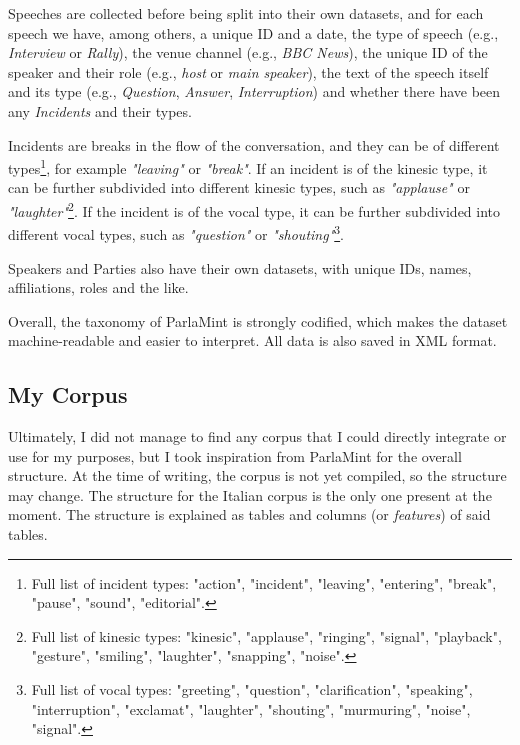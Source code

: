 Speeches are collected before being split into their own datasets, and for each speech we have, among others, a unique ID and a date, the type of speech (e.g., \textit{Interview} or \textit{Rally}), the venue channel (e.g., \textit{BBC News}), the unique ID of the speaker and their role (e.g., \textit{host} or \textit{main speaker}), the text of the speech itself and its type (e.g., \textit{Question}, \textit{Answer}, \textit{Interruption}) and whether there have been any \textit{Incidents} and their types.

Incidents are breaks in the flow of the conversation, and they can be of different types\footnote{Full list of incident types: "action", "incident", "leaving", "entering", "break", "pause", "sound", "editorial".}, for example \textit{"leaving"} or \textit{"break"}. If an incident is of the kinesic type, it can be further subdivided into different kinesic types, such as \textit{"applause"} or \textit{"laughter"}\footnote{Full list of kinesic types: "kinesic", "applause", "ringing", "signal", "playback", "gesture", "smiling", "laughter", "snapping", "noise".}. If the incident is of the vocal type, it can be further subdivided into different vocal types, such as \textit{"question"} or \textit{"shouting"}\footnote{Full list of vocal types: "greeting", "question", "clarification", "speaking", "interruption", "exclamat", "laughter", "shouting", "murmuring", "noise", "signal".}.

Speakers and Parties also have their own datasets, with unique IDs, names, affiliations, roles and the like.

Overall, the taxonomy of ParlaMint is strongly codified, which makes the dataset machine-readable and easier to interpret. All data is also saved in XML format.

\subsection{My Corpus}

Ultimately, I did not manage to find any corpus that I could directly integrate or use for my purposes, but I took inspiration from ParlaMint for the overall structure. 
At the time of writing, the corpus is not yet compiled, so the structure may change. The structure for the Italian corpus is the only one present at the moment. The structure is explained as tables and columns (or \textit{features}) of said tables.

